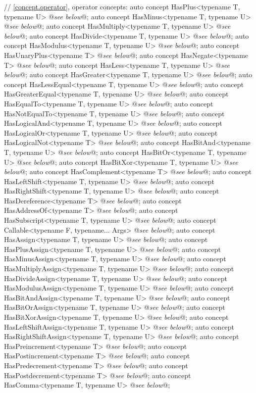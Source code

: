 \documentclass[american,twoside]{book}
\begin{document}
\begin{codeblock}
{  // \ref{concept.operator}, operator concepts:
  auto concept HasPlus<typename T, typename U> @\textit{see below}@;
  auto concept HasMinus<typename T, typename U> @\textit{see below}@;
  auto concept HasMultiply<typename T, typename U> @\textit{see below}@;
  auto concept HasDivide<typename T, typename U> @\textit{see below}@;
  auto concept HasModulus<typename T, typename U> @\textit{see below}@;
  auto concept HasUnaryPlus<typename T> @\textit{see below}@;
  auto concept HasNegate<typename T> @\textit{see below}@;
  auto concept HasLess<typename T, typename U> @\textit{see below}@;
  auto concept HasGreater<typename T, typename U> @\textit{see below}@;
  auto concept HasLessEqual<typename T, typename U> @\textit{see below}@;
  auto concept HasGreaterEqual<typename T, typename U> @\textit{see below}@;
  auto concept HasEqualTo<typename T, typename U> @\textit{see below}@;
  auto concept HasNotEqualTo<typename T, typename U> @\textit{see below}@;
  auto concept HasLogicalAnd<typename T, typename U> @\textit{see below}@;
  auto concept HasLogicalOr<typename T, typename U> @\textit{see below}@;
  auto concept HasLogicalNot<typename T> @\textit{see below}@;
  auto concept HasBitAnd<typename T, typename U> @\textit{see below}@;
  auto concept HasBitOr<typename T, typename U> @\textit{see below}@;
  auto concept HasBitXor<typename T, typename U> @\textit{see below}@;
  auto concept HasComplement<typename T> @\textit{see below}@;
  auto concept HasLeftShift<typename T, typename U> @\textit{see below}@;
  auto concept HasRightShift<typename T, typename U> @\textit{see below}@;
  auto concept HasDereference<typename T> @\textit{see below}@;
  auto concept HasAddressOf<typename T> @\textit{see below}@;
  auto concept HasSubscript<typename T, typename U> @\textit{see below}@;
  auto concept Callable<typename F, typename... Args> @\textit{see below}@;
  auto concept HasAssign<typename T, typename U> @\textit{see below}@;
  auto concept HasPlusAssign<typename T, typename U> @\textit{see below}@;
  auto concept HasMinusAssign<typename T, typename U> @\textit{see below}@;
  auto concept HasMultiplyAssign<typename T, typename U> @\textit{see below}@;
  auto concept HasDivideAssign<typename T, typename U> @\textit{see below}@;
  auto concept HasModulusAssign<typename T, typename U> @\textit{see below}@;
  auto concept HasBitAndAssign<typename T, typename U> @\textit{see below}@;
  auto concept HasBitOrAssign<typename T, typename U> @\textit{see below}@;
  auto concept HasBitXorAssign<typename T, typename U> @\textit{see below}@;
  auto concept HasLeftShiftAssign<typename T, typename U> @\textit{see below}@;
  auto concept HasRightShiftAssign<typename T, typename U> @\textit{see below}@;
  auto concept HasPreincrement<typename T> @\textit{see below}@;
  auto concept HasPostincrement<typename T> @\textit{see below}@;
  auto concept HasPredecrement<typename T> @\textit{see below}@;
  auto concept HasPostdecrement<typename T> @\textit{see below}@;
  auto concept HasComma<typename T, typename U> @\textit{see below}@;

}
\end{codeblock}
\end{document}

